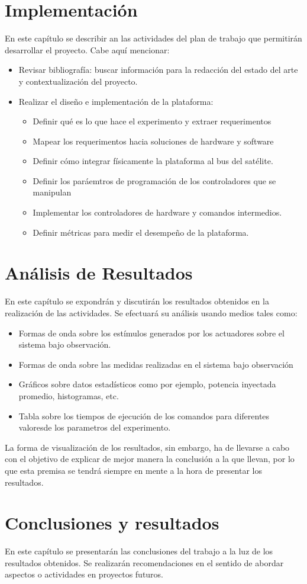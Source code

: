 \documentclass[11pt,letterpaper]{article}
\begin{document}
\section{Implementación}
En este capítulo se describir an las actividades del plan de trabajo que permitirán desarrollar el proyecto. Cabe aquí mencionar:
\begin{itemize}
\item Revisar bibliografía: buscar información para la redacción del estado del arte y contextualización del proyecto.
\item Realizar el diseño e implementación de la plataforma:
\begin{itemize}
\item Definir qu\'e es lo que hace el experimento y extraer requerimentos 
\item Mapear los requerimentos hacia soluciones de hardware y software
\item Definir cómo integrar físicamente la plataforma al bus del sat\'elite.
\item Definir los paráemtros de programación de los controladores que se manipulan
\item Implementar los controladores de hardware y comandos intermedios.
\item Definir m\'etricas para medir el desempeño de la plataforma.
\end{itemize}
\end{itemize}


\section{Análisis de Resultados}
En este capítulo se expondrán y discutirán los resultados obtenidos en la realización de las actividades. Se efectuará su análisis usando medios tales como:

\begin{itemize}
\item Formas de onda sobre los estímulos generados por los actuadores sobre el sistema bajo observación.
\item Formas de onda sobre las medidas realizadas en el sistema bajo observación
\item Gráficos sobre datos estadísticos como por ejemplo, potencia inyectada promedio, histogramas, etc.
\item Tabla sobre los tiempos de ejecución de los comandos para diferentes valoresde los parametros del experimento.
\end{itemize}

La forma de visualización de los resultados, sin embargo, ha de llevarse a cabo con el objetivo de explicar de mejor manera la conclusión a la que llevan, por lo que esta premisa se tendrá siempre en mente a la hora de presentar los resultados.
\section{Conclusiones y resultados}
En este capítulo se presentarán las conclusiones del trabajo a la luz de los resultados obtenidos. Se realizarán recomendaciones en el sentido de abordar aspectos o actividades en proyectos futuros.
\end{document}
